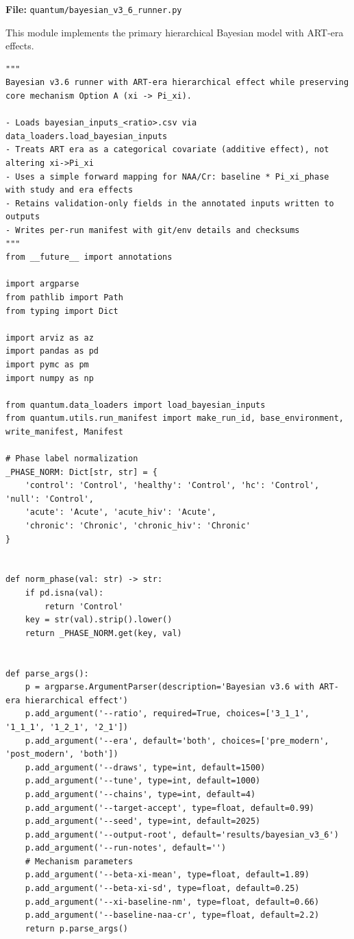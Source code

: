 \documentclass[11pt]{article}
\begin{document}
\textbf{File:} \texttt{quantum/bayesian\_v3\_6\_runner.py}

This module implements the primary hierarchical Bayesian model with ART-era effects.

\begin{lstlisting}[caption={Bayesian v3.6 Runner (Lines 1--100)}]
"""
Bayesian v3.6 runner with ART-era hierarchical effect while preserving
core mechanism Option A (xi -> Pi_xi).

- Loads bayesian_inputs_<ratio>.csv via data_loaders.load_bayesian_inputs
- Treats ART era as a categorical covariate (additive effect), not altering xi->Pi_xi
- Uses a simple forward mapping for NAA/Cr: baseline * Pi_xi_phase with study and era effects
- Retains validation-only fields in the annotated inputs written to outputs
- Writes per-run manifest with git/env details and checksums
"""
from __future__ import annotations

import argparse
from pathlib import Path
from typing import Dict

import arviz as az
import pandas as pd
import pymc as pm
import numpy as np

from quantum.data_loaders import load_bayesian_inputs
from quantum.utils.run_manifest import make_run_id, base_environment, write_manifest, Manifest

# Phase label normalization
_PHASE_NORM: Dict[str, str] = {
    'control': 'Control', 'healthy': 'Control', 'hc': 'Control', 'null': 'Control',
    'acute': 'Acute', 'acute_hiv': 'Acute',
    'chronic': 'Chronic', 'chronic_hiv': 'Chronic'
}


def norm_phase(val: str) -> str:
    if pd.isna(val):
        return 'Control'
    key = str(val).strip().lower()
    return _PHASE_NORM.get(key, val)


def parse_args():
    p = argparse.ArgumentParser(description='Bayesian v3.6 with ART-era hierarchical effect')
    p.add_argument('--ratio', required=True, choices=['3_1_1', '1_1_1', '1_2_1', '2_1'])
    p.add_argument('--era', default='both', choices=['pre_modern', 'post_modern', 'both'])
    p.add_argument('--draws', type=int, default=1500)
    p.add_argument('--tune', type=int, default=1000)
    p.add_argument('--chains', type=int, default=4)
    p.add_argument('--target-accept', type=float, default=0.99)
    p.add_argument('--seed', type=int, default=2025)
    p.add_argument('--output-root', default='results/bayesian_v3_6')
    p.add_argument('--run-notes', default='')
    # Mechanism parameters
    p.add_argument('--beta-xi-mean', type=float, default=1.89)
    p.add_argument('--beta-xi-sd', type=float, default=0.25)
    p.add_argument('--xi-baseline-nm', type=float, default=0.66)
    p.add_argument('--baseline-naa-cr', type=float, default=2.2)
    return p.parse_args()



\end{lstlisting}
\end{document}
